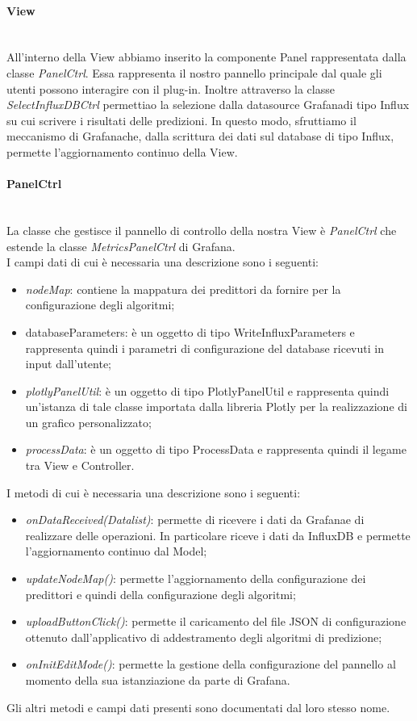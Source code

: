\paragraph{View} \mbox{}\\ [1mm]
All'interno della View abbiamo inserito la componente Panel rappresentata dalla classe \textit{PanelCtrl}. Essa rappresenta il nostro pannello principale dal quale gli utenti possono interagire con il plug-in.
Inoltre attraverso la classe \textit{SelectInfluxDBCtrl} permettiao la selezione dalla datasource Grafana\glosp di tipo Influx su cui scrivere i risultati delle predizioni. In questo modo, sfruttiamo il meccanismo di Grafana\glosp che, dalla scrittura dei dati sul database di tipo Influx, permette l'aggiornamento continuo della View.
\paragraph*{PanelCtrl} \mbox{}\\ [1mm]
La classe che gestisce il pannello di controllo della nostra View è \textit{PanelCtrl} che estende la classe \textit{MetricsPanelCtrl} di Grafana\glo. \\
I campi dati di cui è necessaria una descrizione sono i seguenti:
\begin{itemize}
	\item \textit{nodeMap}: contiene la mappatura dei predittori da fornire per la configurazione degli algoritmi;
	\item databaseParameters: è un oggetto di tipo WriteInfluxParameters e rappresenta quindi i parametri di configurazione del database ricevuti in input dall'utente;
	\item \textit{plotlyPanelUtil}: è un oggetto di tipo PlotlyPanelUtil e rappresenta quindi un'istanza di tale classe importata dalla libreria Plotly per la realizzazione di un grafico personalizzato;
	\item \textit{processData}: è un oggetto di tipo ProcessData e rappresenta quindi il legame tra View e Controller.
\end{itemize}
I metodi di cui è necessaria una descrizione sono i seguenti:
\begin{itemize}
	\item \textit{onDataReceived(Datalist)}: permette di ricevere i dati da Grafana\glosp e di realizzare delle operazioni. In particolare riceve i dati da InfluxDB e permette l'aggiornamento continuo dal Model;
	\item \textit{updateNodeMap()}: permette l'aggiornamento della configurazione dei predittori e quindi della configurazione degli algoritmi;
	\item \textit{uploadButtonClick()}: permette il caricamento del file JSON di configurazione ottenuto dall'applicativo di addestramento degli algoritmi di predizione;
	\item \textit{onInitEditMode()}: permette la gestione della configurazione del pannello al momento della sua istanziazione da parte di Grafana\glo.
\end{itemize}
Gli altri metodi e campi dati presenti sono documentati dal loro stesso nome.
